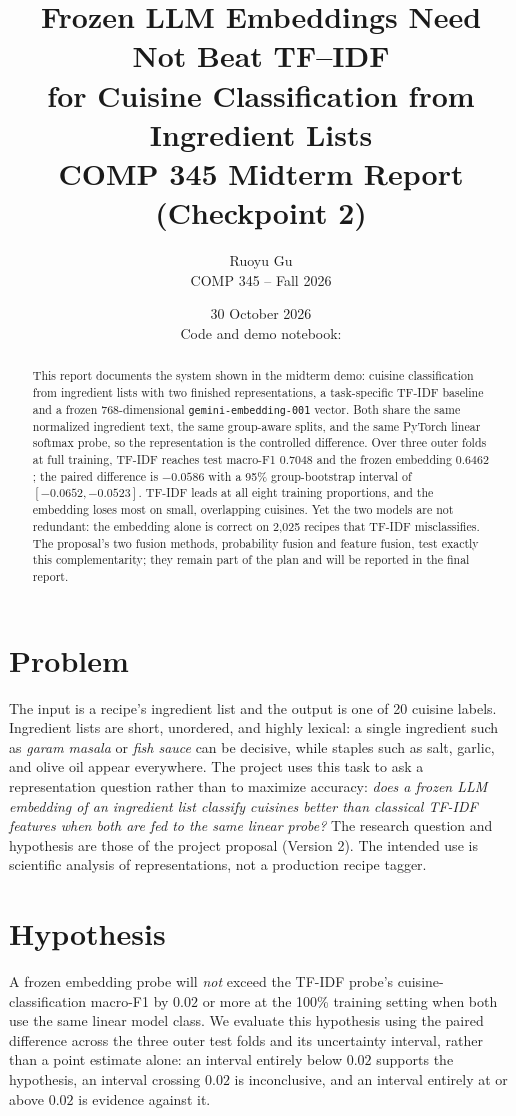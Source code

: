 \documentclass[11pt,letterpaper]{article}
\title{\vspace{-1.0cm}\textbf{Frozen LLM Embeddings Need Not Beat TF--IDF\\for Cuisine Classification from Ingredient Lists}\\[0.2em]\large COMP 345 Midterm Report (Checkpoint 2)}
\author{Ruoyu Gu\\COMP 345 -- Fall 2026}
\date{30 October 2026\\[0.3em]\small Code and demo notebook: \repolink}
\newcommand{\tfidf}{TF-IDF}
\newcommand{\macrof}{macro-F1}
\begin{document}
\maketitle
\thispagestyle{fancy}

\begin{abstract}
This report documents the system shown in the midterm demo: cuisine classification from ingredient lists with two finished representations, a task-specific \tfidf{} baseline and a frozen 768-dimensional \texttt{gemini-embedding-001} vector. Both share the same normalized ingredient text, the same group-aware splits, and the same PyTorch linear softmax probe, so the representation is the controlled difference. Over three outer folds at full training, \tfidf{} reaches test \macrof{} $0.7048$ and the frozen embedding $0.6462$; the paired difference is $-0.0586$ with a 95\% group-bootstrap interval of $[-0.0652,-0.0523]$. \tfidf{} leads at all eight training proportions, and the embedding loses most on small, overlapping cuisines. Yet the two models are not redundant: the embedding alone is correct on 2,025 recipes that \tfidf{} misclassifies. The proposal's two fusion methods, probability fusion and feature fusion, test exactly this complementarity; they remain part of the plan and will be reported in the final report.
\end{abstract}

\section{Problem}
The input is a recipe's ingredient list and the output is one of 20 cuisine labels. Ingredient lists are short, unordered, and highly lexical: a single ingredient such as \emph{garam masala} or \emph{fish sauce} can be decisive, while staples such as salt, garlic, and olive oil appear everywhere. The project uses this task to ask a representation question rather than to maximize accuracy:
\emph{does a frozen LLM embedding of an ingredient list classify cuisines better than classical \tfidf{} features when both are fed to the same linear probe?}
The research question and hypothesis are those of the project proposal (Version 2). The intended use is scientific analysis of representations, not a production recipe tagger.

\section{Hypothesis}
A frozen embedding probe will \emph{not} exceed the \tfidf{} probe's cuisine-classification \macrof{} by $0.02$ or more at the 100\% training setting when both use the same linear model class. We evaluate this hypothesis using the paired difference across the three outer test folds and its uncertainty interval, rather than a point estimate alone: an interval entirely below $0.02$ supports the hypothesis, an interval crossing $0.02$ is inconclusive, and an interval entirely at or above $0.02$ is evidence against it.
\end{document}
